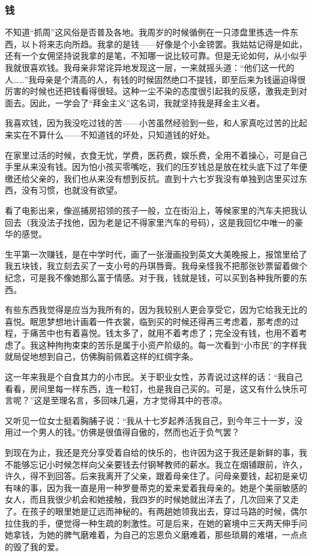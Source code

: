 \subsubsection*{钱}
\par 不知道“抓周”这风俗是否普及各地。我周岁的时候循例在一只漆盘里拣选一件东西，以卜将来志向所趋。我拿的是钱——好像是个小金镑罢。我姑姑记得是如此，还有一个女佣坚持说我拿的是笔，不知哪一说比较可靠。但是无论如何，从小似乎我就很喜欢钱。我母亲非常诧异地发现这一层，一来就摇头道：“他们这一代的人……”我母亲是个清高的人，有钱的时候固然绝口不提钱，即至后来为钱逼迫得很厉害的时候也还把钱看得很轻。这种一尘不染的态度很引起我的反感，激我走到对面去。因此，一学会了“拜金主义”这名词，我就坚持我是拜金主义者。
\par 我喜欢钱，因为我没吃过钱的苦——小苦虽然经验到一些，和人家真吃过苦的比起来实在不算什么——不知道钱的坏处，只知道钱的好处。
\par 在家里过活的时候，衣食无忧，学费，医药费，娱乐费，全用不着操心，可是自己手里从来没有钱。因为怕小孩买零嘴吃，我们的压岁钱总是放在枕头底下过了年便缴还给父亲的，我们也从来没有想到反抗。直到十六七岁我没有单独到店里买过东西，没有习惯，也就没有欲望。
\par 看了电影出来，像巡捕房招领的孩子一般，立在街沿上，等候家里的汽车夫把我认回去（我没法子找他，因为老是记不得家里汽车的号码），这是我回忆中唯一的豪华的感觉。
\par 生平第一次赚钱，是在中学时代，画了一张漫画投到英文大美晚报上，报馆里给了我五块钱，我立刻去买了一支小号的丹琪唇膏。我母亲怪我不把那张钞票留着做个纪念，可是我不像她那么富于情感。对于我，钱就是钱，可以买到各种我所要的东西。
\par 有些东西我觉得是应当为我所有的，因为我较别人更会享受它，因为它给我无比的喜悦。眠思梦想地计画着一件衣裳，临到买的时候还得再三考虑着，那考虑的过程，于痛苦中也有着喜悦。钱太多了，就用不着考虑了；完全没有钱，也用不着考虑了。我这种拘拘束束的苦乐是属于小资产阶级的。每一次看到“小市民”的字样我就局促地想到自己，仿佛胸前佩着这样的红绸字条。
\par 这一年来我是个自食其力的小市民。关于职业女性，苏青说过这样的话：“我自己看看，房间里每一样东西，连一粒钉，也是我自己买的。可是，这又有什么快乐可言呢？”这是至理名言，多回味几遍，方才觉得其中的苍凉。
\par 又听见一位女士挺着胸脯子说：“我从十七岁起养活我自己，到今年三十一岁，没用过一个男人的钱。”仿佛是很值得自傲的，然而也近于负气罢？
\par 到现在为止，我还是充分享受着自给的快乐的，也许因为这于我还是新鲜的事，我不能够忘记小时候怎样向父亲要钱去付钢琴教师的薪水。我立在烟铺跟前，许久，许久，得不到回答。后来我离开了父亲，跟着母亲住了。问母亲要钱，起初是亲切有味的事，因为我一直是用一种罗曼蒂克的爱来爱着我母亲的。她是个美丽敏感的女人，而且我很少机会和她接触，我四岁的时候她就出洋去了，几次回来了又走了。在孩子的眼里她是辽远而神秘的。有两趟她领我出去，穿过马路的时候，偶尔拉住我的手，便觉得一种生疏的刺激性。可是后来，在她的窘境中三天两天伸手问她拿钱，为她的脾气磨难着，为自己的忘恩负义磨难着，那些琐屑的难堪，一点点的毁了我的爱。
